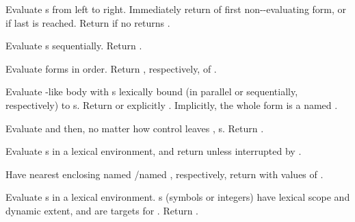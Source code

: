 \begin{LIST}{1cm}
  {
    Evaluate s from left to
    right. Immediately return  of first
    non-\NIL-evaluating form, or  if last 
    is reached. Return \retval{\NIL} if no  returns \T.
  }

  {\label{:progn}
    Evaluate s sequentially. Return
    .
  }

  {
    Evaluate forms in order. Return ,
    respectively, of .
  }

  {
    Evaluate -like body with s lexically bound (in
    parallel or sequentially, respectively) to s. Return
    \retval{\NIL} or explicitly .
    Implicitly, the whole form is a  named \NIL.
  }

  {
    Evaluate  and then, no matter how control leaves
    , s. Return .
  }

  {
    Evaluate s in a lexical environment, and
    return  unless interrupted by
    .
  }

  {
    Have nearest enclosing  named /named \NIL,
    respectively, return with values of .
  }

  {
    Evaluate s in a lexical environment. s (symbols
    or integers) have lexical scope and dynamic extent, and are
    targets for . Return \retval{\NIL}.
  }


\end{LIST}

